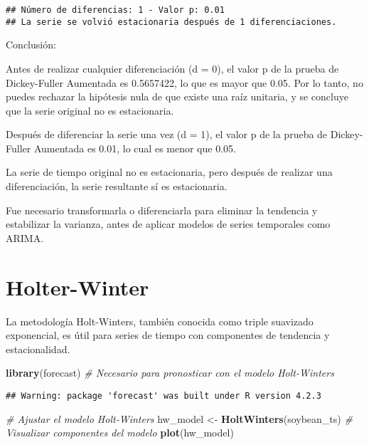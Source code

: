 \documentclass[
]{book}
\newenvironment{Shaded}{\begin{snugshade}}{\end{snugshade}}
\newcommand{\CommentTok}[1]{\textcolor[rgb]{0.56,0.35,0.01}{\textit{#1}}}
\newcommand{\FunctionTok}[1]{\textcolor[rgb]{0.13,0.29,0.53}{\textbf{#1}}}
\newcommand{\NormalTok}[1]{#1}
\newcommand{\OtherTok}[1]{\textcolor[rgb]{0.56,0.35,0.01}{#1}}
\begin{document}
\begin{verbatim}
## Número de diferencias: 1 - Valor p: 0.01 
## La serie se volvió estacionaria después de 1 diferenciaciones.
\end{verbatim}

Conclusión:

Antes de realizar cualquier diferenciación (d = 0), el valor p de la prueba de Dickey-Fuller Aumentada es 0.5657422, lo que es mayor que 0.05. Por lo tanto, no puedes rechazar la hipótesis nula de que existe una raíz unitaria, y se concluye que la serie original no es estacionaria.

Después de diferenciar la serie una vez (d = 1), el valor p de la prueba de Dickey-Fuller Aumentada es 0.01, lo cual es menor que 0.05.

La serie de tiempo original no es estacionaria, pero después de realizar una diferenciación, la serie resultante sí es estacionaria.

Fue necesario transformarla o diferenciarla para eliminar la tendencia y estabilizar la varianza, antes de aplicar modelos de series temporales como ARIMA.

\hypertarget{holter-winter}{%
\chapter{Holter-Winter}\label{holter-winter}}

La metodología Holt-Winters, también conocida como triple suavizado exponencial, es útil para series de tiempo con componentes de tendencia y estacionalidad.

\begin{Shaded}
\begin{Highlighting}[]
\FunctionTok{library}\NormalTok{(forecast)  }\CommentTok{\# Necesario para pronosticar con el modelo Holt{-}Winters}
\end{Highlighting}
\end{Shaded}

\begin{verbatim}
## Warning: package 'forecast' was built under R version 4.2.3
\end{verbatim}

\begin{Shaded}
\begin{Highlighting}[]
\CommentTok{\# Ajustar el modelo Holt{-}Winters}
\NormalTok{hw\_model }\OtherTok{\textless{}{-}} \FunctionTok{HoltWinters}\NormalTok{(soybean\_ts)}
\CommentTok{\# Visualizar componentes del modelo}
\FunctionTok{plot}\NormalTok{(hw\_model)}
\end{Highlighting}
\end{Shaded}
\end{document}
